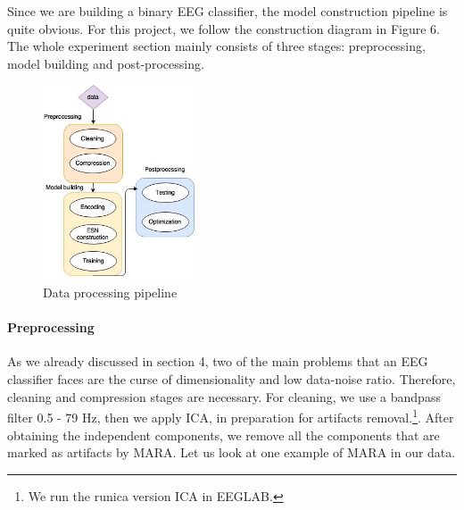 \documentclass[a4paper,11pt,oneside]{article}
\begin{document}
Since we are building a binary EEG classifier, the model construction pipeline is quite obvious. For this project, we follow the construction diagram in Figure 6. The whole experiment section mainly consists of three stages: preprocessing, model building and post-processing.

	\begin{figure}[!h]
	\centering
	\includegraphics[width=0.40\textwidth]{img/dataflow}
	\caption{Data processing pipeline}
\end{figure}

	\paragraph{Preprocessing} As we already discussed in section 4, two of the main problems that an EEG classifier faces are the curse of dimensionality and low data-noise ratio. Therefore, cleaning and compression stages are necessary. For cleaning, we use a bandpass filter 0.5 - 79 Hz, then we apply ICA, in preparation for artifacts removal.\footnote{We run the runica version ICA in EEGLAB.}. After obtaining the independent components, we remove all the components that are marked as artifacts by MARA. Let us look at one example of MARA in our data. 
\end{document}
